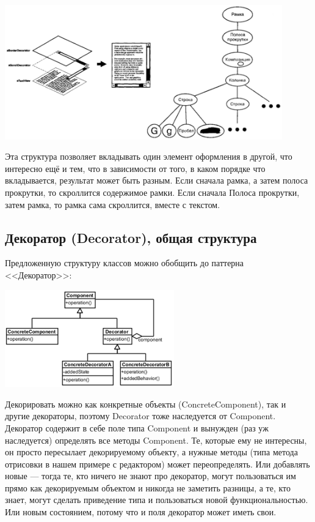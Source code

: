 \documentclass{../mcstext}
\begin{document}
\begin{center}
    \includegraphics[width=0.9\textwidth]{glyphStructure.png}
\end{center}

Эта структура позволяет вкладывать один элемент оформления в другой, что интересно ещё и тем, что в зависимости от того, в каком порядке что вкладывается, результат может быть разным. Если сначала рамка, а затем полоса прокрутки, то скроллится содержимое рамки. Если сначала Полоса прокрутки, затем рамка, то рамка сама скроллится, вместе с текстом.

\subsection{Декоратор (Decorator), общая структура}

Предложенную структуру классов можно обобщить до паттерна <<Декоратор>>:

\begin{center}
    \includegraphics[width=0.55\textwidth]{decorator.png}
\end{center}

Декорировать можно как конкретные объекты (ConcreteComponent), так и другие декораторы, поэтому Decorator тоже наследуется от Component. Декоратор содержит в себе поле типа Component и вынужден (раз уж наследуется) определять все методы Component. Те, которые ему не интересны, он просто пересылает декорируемому объекту, а нужные методы (типа метода отрисовки в нашем примере с редактором) может переопределять. Или добавлять новые --- тогда те, кто ничего не знают про декоратор, могут пользоваться им прямо как декорируемым объектом и никогда не заметить разницы, а те, кто знает, могут сделать приведение типа и пользоваться новой функциональностью. Или новым состоянием, потому что и поля декоратор может иметь свои.
\end{document}

